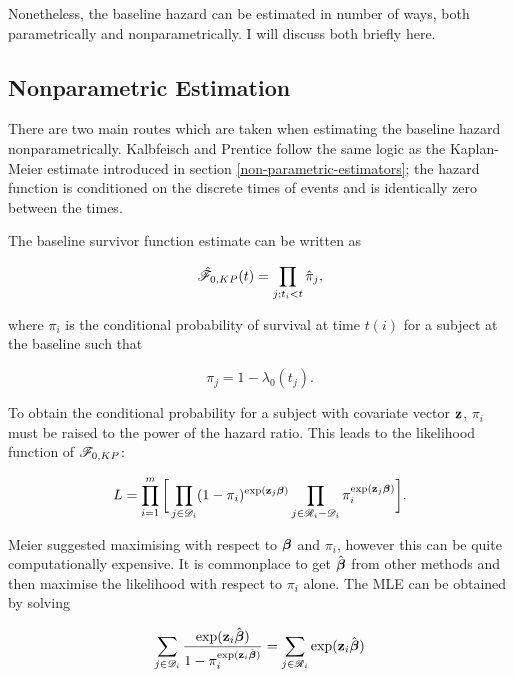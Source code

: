 Nonetheless, the baseline hazard can be estimated in number of ways, both parametrically and nonparametrically. I will discuss both briefly here. 

\subsection{Nonparametric Estimation}

There are two main routes which are taken when estimating the baseline hazard nonparametrically. Kalbfeisch and Prentice  follow the same logic as the Kaplan-Meier estimate introduced in section \ref{non-parametric-estimators}; the hazard function is conditioned on the discrete times of events and is identically zero between the times. 

The baseline survivor function estimate can be written as

\begin{equation}
    \hat{\mathscr{F}}_{0,KP}(t)=\prod_{j;t_i<t}\hat{\pi}_j,
\end{equation}

where $\pi_i$ is the conditional probability of survival at time $t(i)$ for a subject at the baseline such that

\begin{equation}
    \pi_j = 1 - \lambda_0(t_j).
\end{equation}

To obtain the conditional probability for a subject with covariate vector $\textbf{z}$, $\pi_i$ must be raised to the power of the hazard ratio. This leads to the likelihood function of $\mathscr{F}_{0,KP}$:

\begin{equation}\label{MLE-KP}
    L = \prod_{i=1}^m\bigg[\prod_{j\in\mathscr{D}_i}(1-\pi_i)^{\exp(\textbf{z}_j\boldsymbol{\beta})} \prod_{j\in\mathscr{R}_i-\mathscr{D}_i}\pi_i^{\exp(\textbf{z}_j\boldsymbol{\beta})}\bigg].
\end{equation}

Meier suggested maximising  with respect to $\boldsymbol{\beta}$ and $\pi_i$, however this can be quite computationally expensive. It is commonplace to get $\hat{\boldsymbol{\beta}}$ from other methods and then maximise the likelihood with respect to $\pi_i$ alone. The MLE can be obtained by solving

\begin{equation}\label{MLE-KP-max}
    \sum_{j\in\mathscr{D}_i} \frac{\exp(\textbf{z}_i\hat{\boldsymbol{\beta}})}{1-\pi_i^{\exp(\textbf{z}_i\hat{\boldsymbol{\beta}})}} = \sum_{j\in\mathscr{R}_i}\exp(\textbf{z}_i\hat{\boldsymbol{\beta}})
\end{equation}

